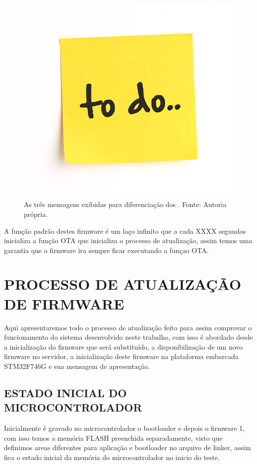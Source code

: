 \begin{figure}[H]
    \scriptsize
     \centering
     \includegraphics[scale=1.2]{dados/figuras/ToDo.jpg}
     \caption{As três mensagens exibidas para diferenciação dos \firmware. \newline Fonte: Autoria própria.}
     \label{mensagemteste}
\end{figure}

A função padrão destes firmware é um laço infinito que a cada XXXX segundos inicializa a função OTA que inicializa o processo de atualização, assim temos uma garantia que o firmware ira sempre ficar executando a funçao OTA.

\section{PROCESSO DE ATUALIZAÇÃO DE FIRMWARE}
Aqui apresentaremos todo o processo de atualização feito para assim comprovar o funcionamento do sistema desenvolvido neste trabalho, com isso é abordado desde a inicialização do firmware que será substituído, a disponibilização de um novo firmware no servidor, a inicialização deste firmware na plataforma embarcada STM32F746G e sua mensagem de apresentação.

\subsection{ESTADO INICIAL DO MICROCONTROLADOR}
Inicialmente é gravado no microcontrolador o bootloader e depois o firmware 1, com isso temos a memória FLASH preenchida separadamente, visto que definimos areas diferentes para aplicação e bootloader no arquivo de linker, assim fica o estado inicial da memória do microcontrolador no inicio do teste.

